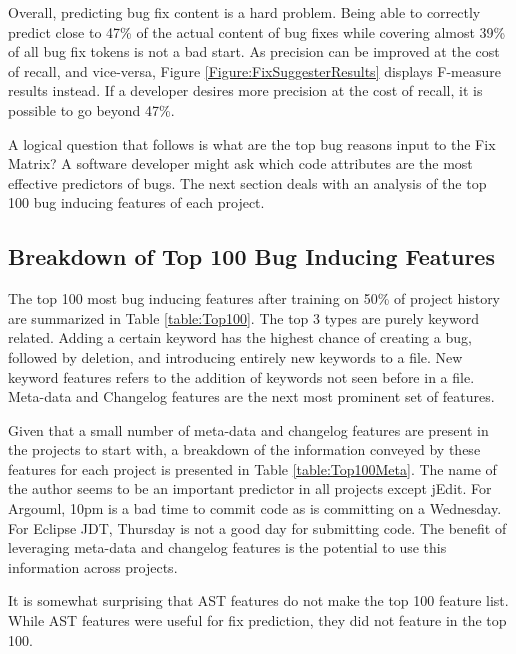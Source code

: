 \documentclass[journal,10pt,draftclsnofoot,twocolumn]{IEEEtran}
\begin{document}
Overall, predicting bug fix content is a hard problem. Being able to correctly predict close to 47\% of the actual content of bug fixes while covering almost 39\% of all bug fix tokens is not a bad start. As precision can be improved at the cost of recall, and vice-versa, Figure \ref{Figure:FixSuggesterResults} displays F-measure results instead. If a developer desires more precision at the cost of recall, it is possible to go beyond 47\%. 

\par A logical question that follows is what are the top bug reasons input to the Fix Matrix? A software developer might ask which code attributes are the most effective predictors of bugs. The next section deals with an analysis of the top 100 bug inducing features of each project.

\subsection{Breakdown of Top 100 Bug Inducing Features}
\label{Top100BugReasons}
The top 100 most bug inducing features after training on 50\% of project history are summarized in Table \ref{table:Top100}. The top 3 types are purely keyword related. Adding a certain keyword has the highest chance of creating a bug, followed by deletion, and introducing entirely new keywords to a file. New keyword features refers to the addition of keywords not seen before in a file. Meta-data and Changelog features are the next most prominent set of features. 

Given that a small number of meta-data and changelog features are present in the projects to start with, a breakdown of the information conveyed by these features for each project is presented in Table \ref{table:Top100Meta}. The name of the author seems to be an important predictor in all projects except jEdit. For Argouml, 10pm is a bad time to commit code as is committing on a Wednesday. For Eclipse JDT, Thursday is not a good day for submitting code. The benefit of leveraging meta-data and changelog features is the potential to use this information across projects.

\par It is somewhat surprising that AST features do not make the top 100 feature list. While AST features were useful for fix prediction, they did not feature in the top 100.
\end{document}
